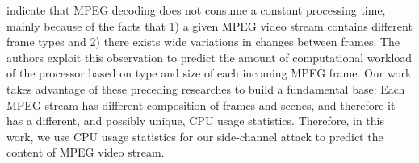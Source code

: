 \cite{Bavier98predictingmpeg}\cite{DVFS} indicate that MPEG decoding does not consume a constant processing time, mainly because of the facts that 1) a given MPEG video stream contains different frame types and 2) there exists wide variations in changes between frames. 
The authors exploit this observation to predict the amount of computational workload of the processor based on type and size of each incoming MPEG frame.
Our work takes advantage of these preceding researches to build a fundamental base: Each MPEG stream has different composition of frames and scenes, and therefore it has a different, and possibly unique, CPU usage statistics. 
Therefore, in this work, we use CPU usage statistics for our side-channel attack to predict the content of MPEG video stream. 



\begin{comment}

\cite{MPEG} MPEG terminology. \term{I-frame}, \term{P-frame}, \term{B-frame}. (from DVFS 2.2). 
The authors empirically studied the relationship between the decoding time and the data size of each frame.  (from DVFS 2.3). 

\cite{DVFS}  predicts the amount of computational workload of ARM processor based on the type of each incoming frame.
IDCT and Reconstruction take more than half of CPU time. 
IDCT is CPU intensive and its computation time is dependent on frmae type.


and more citations show a process without admin privilege can monitor other process' information through \term{proc}. 

shows CPU usage pattern can be used for side-channel attack. 

shows a person's preference on movies can reveal sensitive information such as ....

\end{comment}